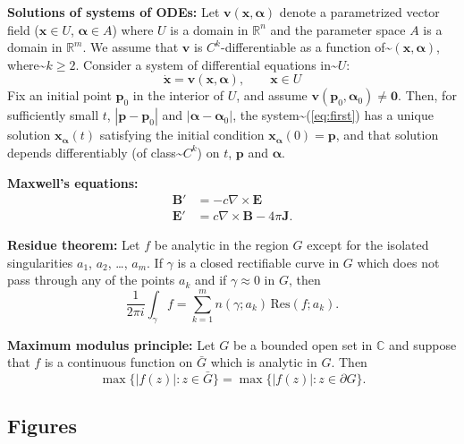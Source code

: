 \documentclass[
12pt,
a4paper,
twoside,
]{article}
\begin{document}
\textbf{Solutions of systems of ODEs:} Let
\(\mathbf{v}(\mathbf{x},\boldsymbol{\alpha})\) denote a parametrized
vector field (\(\mathbf{x}\in U\), \(\boldsymbol{\alpha}\in A\)) where
\(U\) is a domain in \(\mathbb{R}^n\) and the parameter space \(A\) is a
domain in \(\mathbb{R}^m\). We assume that \(\mathbf{v}\) is
\(C^k\)-differentiable as a function
of\textasciitilde{}\((\mathbf{x},\boldsymbol{\alpha})\),
where\textasciitilde{}\(k\ge 2\). Consider a system of differential
equations in\textasciitilde{}\(U\): \begin{equation}
\mathbf{\dot x}=\mathbf{v}(\mathbf{x},\boldsymbol{\alpha}),\qquad \mathbf{x}\in U\label{eq:first}
\end{equation} Fix an initial point \(\mathbf{p}_0\) in the interior of
\(U\), and assume
\(\mathbf{v}(\mathbf{p}_0,\boldsymbol{\alpha}_0)\neq\mathbf{0}\). Then,
for sufficiently small \(t\), \(|\mathbf{p}-\mathbf{p}_0|\) and
\(|\boldsymbol{\alpha}-\boldsymbol{\alpha}_0|\), the
system\textasciitilde(\ref{eq:first}) has a unique solution
\(\mathbf{x}_{\boldsymbol{\alpha}}(t)\) satisfying the initial condition
\(\mathbf{x}_{\boldsymbol{\alpha}}(0)=\mathbf{p}\), and that solution
depends differentiably (of class\textasciitilde{}\(C^k\)) on \(t\),
\(\mathbf{p}\) and \(\boldsymbol{\alpha}\).

\textbf{Maxwell's equations:} \begin{equation*}
\begin{aligned}
\mathbf{B}'&=-c\nabla\times\mathbf{E}\\
\mathbf{E}'&=c\nabla\times\mathbf{B}-4\pi \mathbf{J}.
\end{aligned}
\end{equation*}

\textbf{Residue theorem:} Let \(f\) be analytic in the region \(G\)
except for the isolated singularities \(a_1\), \(a_2\), \ldots, \(a_m\).
If \(\gamma\) is a closed rectifiable curve in \(G\) which does not pass
through any of the points \(a_k\) and if \(\gamma\approx 0\) in \(G\),
then
\[\frac{1}{2\pi i}\int_\gamma f=\sum_{k=1}^m n(\gamma;a_k)\,\mathrm{Res}(f;a_k).\]

\textbf{Maximum modulus principle:} Let \(G\) be a bounded open set in
\(\mathbb{C}\) and suppose that \(f\) is a continuous function on
\(\bar G\) which is analytic in \(G\). Then
\[\max \{|f(z)| : z\in \bar G\}=\max\{|f(z)| : z\in \partial G\}.\]

\subsection{Figures}\label{figures}
\end{document}
